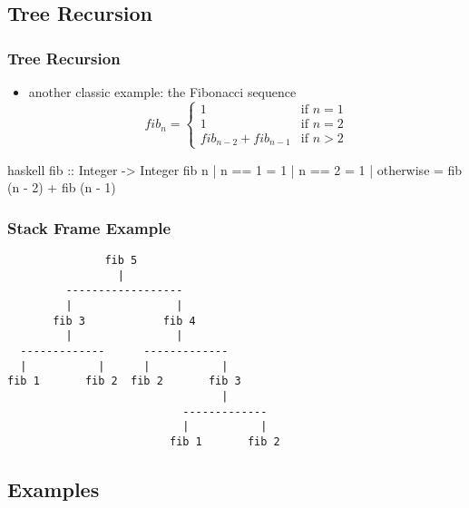 \documentclass[dvipsnames]{beamer}
\theoremstyle{plain}
\begin{document}
\subsection{Tree Recursion}

\begin{frame}[fragile]
  \frametitle{Tree Recursion}

  \begin{itemize}
    \item another classic example: the Fibonacci sequence
    \[
      fib_n =
        \begin{cases}
          1                     & \mbox{if } n = 1\\
          1                     & \mbox{if } n = 2\\
          fib_{n-2} + fib_{n-1} & \mbox{if } n > 2
        \end{cases}
    \]
  \end{itemize}

  \begin{exampleblock}{}
    \begin{pygments}{haskell}
fib :: Integer -> Integer
fib n
  | n == 1    = 1
  | n == 2    = 1
  | otherwise = fib (n - 2) + fib (n - 1)
    \end{pygments}
  \end{exampleblock}
\end{frame}

\begin{frame}[fragile]
  \frametitle{Stack Frame Example}

  \begin{verbatim}
               fib 5
                 |
         ------------------
         |                |
       fib 3            fib 4
         |                |
  -------------      -------------
  |           |      |           |
fib 1       fib 2  fib 2       fib 3
                                 |
                           -------------
                           |           |
                         fib 1       fib 2
  \end{verbatim}
\end{frame}

\subsection{Examples}
\end{document}
